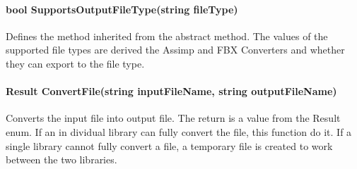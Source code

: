         \paragraph{bool SupportsOutputFileType(string fileType)}
            \hfill \break
            Defines the method inherited from the abstract method.  The values of the supported file types are derived the Assimp and FBX Converters and whether they can export to the file type.

        \paragraph{Result ConvertFile(string inputFileName, string outputFileName)}
            \hfill \break
            Converts the input file into output file.  The return is a value from the Result enum.  If an in dividual library can fully convert the file, this function do it.  If a single library cannot fully convert a file, a temporary file is created to work between the two libraries.
        
        